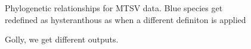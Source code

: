 \documentclass{article}
\begin{document}
\begin{figure}[h!]
  \centering
   \caption{Phylogenetic relationships for MTSV data. Blue species get redefined as hysteranthous as when a different definiton is applied}
\end{figure}

\begin{figure}[!tbp]
  \centering
\caption{Golly, we get different outputs.}
\end{figure}
\end{document}
